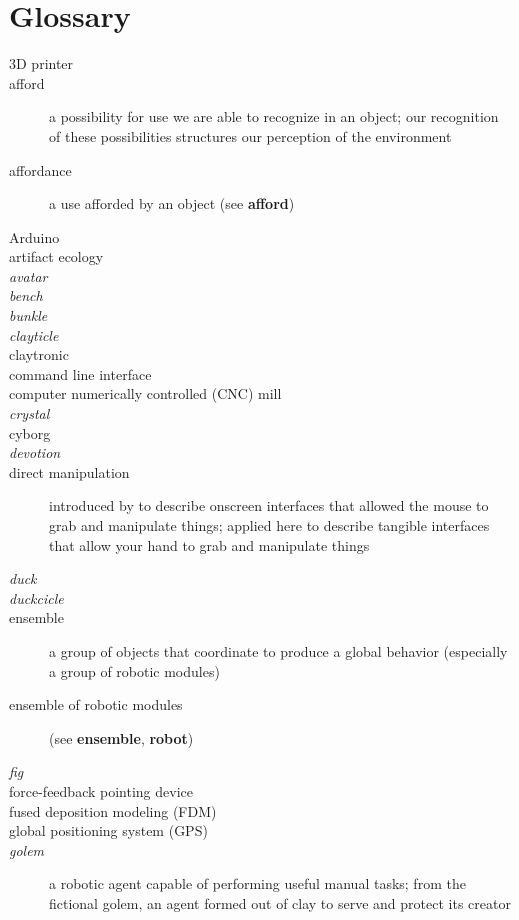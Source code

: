 \chapter{Glossary}
%
\begin{description}
%
\item[3D printer]
%
\item[afford] a possibility for use we are able to recognize in an object; our recognition of these possibilities structures our perception of the environment \citep{gibson_1979}
%
\item[affordance] a use afforded by an object (see {\bf afford})
%
\item[Arduino]
%
\item[artifact ecology]
%
\item[\emph{avatar}]
%
\item[\emph{bench}]
%
\item[\emph{bunkle}]
%
\item[\emph{clayticle}]
%
\item[claytronic]
%
\item[command line interface]
%
\item[computer numerically controlled (CNC) mill]
%
\item[\emph{crystal}]
%
\item[cyborg]
%
\item[\emph{devotion}]
%
\item[direct manipulation] introduced by \citet{shneiderman_computer1983} to describe onscreen interfaces that allowed the mouse to grab and manipulate things; applied here to describe tangible interfaces that allow your hand to grab and manipulate things
%
\item[\emph{duck}]
%
\item[\emph{duckcicle}]
%
\item[ensemble] a group of objects that coordinate to produce a global behavior (especially a group of robotic modules)
%
\item[ensemble of robotic modules] (see {\bf ensemble}, {\bf robot})
%
\item[\emph{fig}]
%
\item[force-feedback pointing device]
%
\item[fused deposition modeling (FDM)]
%
\item[global positioning system (GPS)]
%
\item[\emph{golem}] a robotic agent capable of performing useful manual tasks; from the fictional golem, an agent formed out of clay to serve and protect its creator

\end{description}
